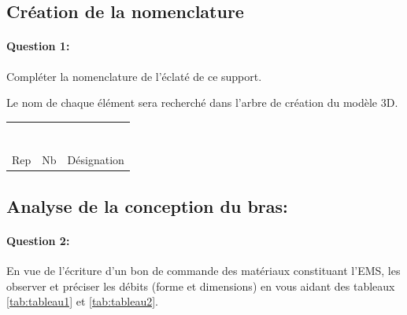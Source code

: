 \subsection{Création de la nomenclature}

\paragraph{Question 1:} Compléter la nomenclature de l'éclaté de ce support.

Le nom de chaque élément sera recherché dans l'arbre de création du modèle 3D.

\begin{table}[!h]
 \begin{center}
  \begin{tabularx}{\linewidth}{|l|l|X|}
  \hline  & & \\ \hline  & & \\ \hline  & & \\ \hline  & & \\  \hline  & & \\ \hline  & & \\ \hline  & & \\ \hline  & & \\   \hline
  Rep & Nb & Désignation \\
  \hline
  \end{tabularx}
 \end{center}
\end{table}

\subsection{Analyse de la conception du bras:}

\paragraph{Question 2:} En vue de l'écriture d'un bon de commande des matériaux constituant l'EMS, les observer et préciser les débits (forme et dimensions) en vous aidant des tableaux \ref{tab:tableau1} et \ref{tab:tableau2}.


